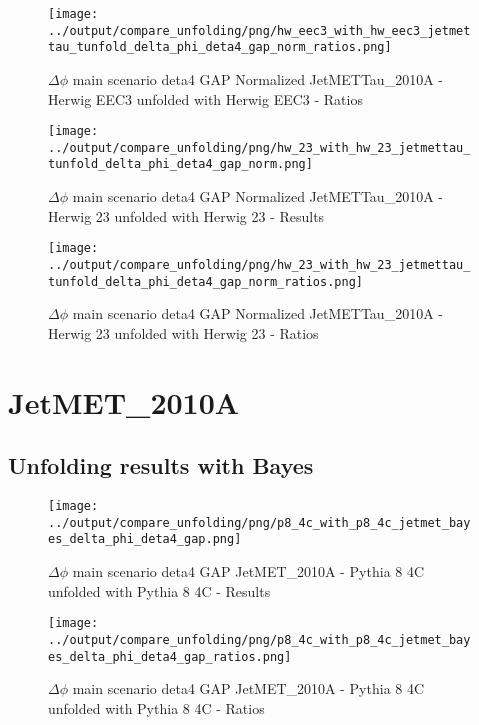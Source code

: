\documentclass[11pt]{book}
\begin{document}
\begin{figure}[ht]
\centering
\texttt{[image: ../output/compare\_unfolding/png/hw\_eec3\_with\_hw\_eec3\_jetmettau\_tunfold\_delta\_phi\_deta4\_gap\_norm\_ratios.png]}
\caption{$\Delta\phi$ main scenario deta4 GAP Normalized JetMETTau\_2010A - Herwig EEC3 unfolded with Herwig EEC3 - Ratios}
\label{hw_eec3_hw_eec3_jetmettau_tunfold_delta_phi_deta4_gap_norm_b}
\end{figure}

\begin{figure}[ht]
\centering
\texttt{[image: ../output/compare\_unfolding/png/hw\_23\_with\_hw\_23\_jetmettau\_tunfold\_delta\_phi\_deta4\_gap\_norm.png]}
\caption{$\Delta\phi$ main scenario deta4 GAP Normalized JetMETTau\_2010A - Herwig 23 unfolded with Herwig 23 - Results}
\label{hw_23_hw_23_jetmettau_tunfold_delta_phi_deta4_gap_norm_a}
\end{figure}

\begin{figure}[ht]
\centering
\texttt{[image: ../output/compare\_unfolding/png/hw\_23\_with\_hw\_23\_jetmettau\_tunfold\_delta\_phi\_deta4\_gap\_norm\_ratios.png]}
\caption{$\Delta\phi$ main scenario deta4 GAP Normalized JetMETTau\_2010A - Herwig 23 unfolded with Herwig 23 - Ratios}
\label{hw_23_hw_23_jetmettau_tunfold_delta_phi_deta4_gap_norm_b}
\end{figure}

\clearpage
\section{JetMET\_2010A}
\subsection{Unfolding results with Bayes}

\begin{figure}[ht]
\centering
\texttt{[image: ../output/compare\_unfolding/png/p8\_4c\_with\_p8\_4c\_jetmet\_bayes\_delta\_phi\_deta4\_gap.png]}
\caption{$\Delta\phi$ main scenario deta4 GAP JetMET\_2010A - Pythia 8 4C unfolded with Pythia 8 4C - Results}
\label{p8_p8_jetmet_bayes_delta_phi_deta4_gap_a}
\end{figure}

\begin{figure}[ht]
\centering
\texttt{[image: ../output/compare\_unfolding/png/p8\_4c\_with\_p8\_4c\_jetmet\_bayes\_delta\_phi\_deta4\_gap\_ratios.png]}
\caption{$\Delta\phi$ main scenario deta4 GAP JetMET\_2010A - Pythia 8 4C unfolded with Pythia 8 4C - Ratios}
\label{p8_p8_jetmet_bayes_delta_phi_deta4_gap_b}
\end{figure}
\end{document}
